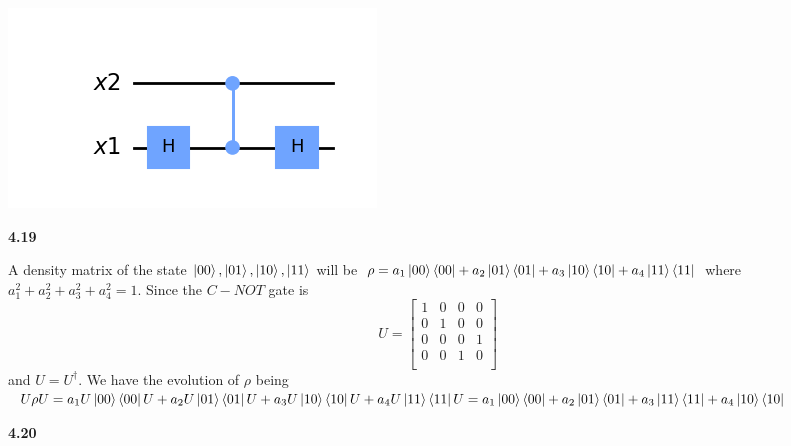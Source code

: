 \includegraphics[]{images/Figure_1.png}

\textbf{4.19}

A density matrix of the state $\ket{00},\ket{01},\ket{10},\ket{11}$ will be $\rho = a_1\ket{00}\bra{00} + a_2\ket{01}\bra{01} + a_3\ket{10}\bra{10} +  a_4\ket{11}\bra{11}$ where $a_1^2 + a_2^2 +a_3^2 +a_4^2= 1$. Since the $C-NOT$ gate is
\[U = \begin{bmatrix}
    1 & 0 & 0 & 0 \\
    0& 1 & 0 & 0\\
    0 & 0 & 0 & 1 \\
    0 & 0 & 1 & 0\\
\end{bmatrix}\] and
$U = U^\dag$. We have the evolution of $\rho$ being $ U\rho U  = a_1U\ket{00}\bra{00}U + a_2U\ket{01}\bra{01}U + a_3U\ket{10}\bra{10}U +  a_4U\ket{11}\bra{11}U = a_1\ket{00}\bra{00} + a_2\ket{01}\bra{01} + a_3\ket{11}\bra{11} +  a_4\ket{10}\bra{10}$

\textbf{4.20}

